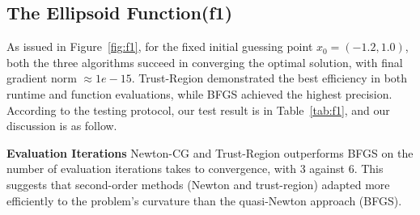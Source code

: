\documentclass[12pt]{article}
\begin{document}
\subsection{The Ellipsoid Function(f1)}

As issued in Figure~\ref{fig:f1}, for the fixed initial guessing point $x_0=(-1.2,1.0)$, both the three algorithms succeed in converging the optimal solution, with final gradient norm $\approx1e-15$. Trust-Region demonstrated the best efficiency in both runtime and function evaluations, while BFGS achieved the highest precision. According to the testing protocol, our test result is in Table~\ref{tab:f1}, and our discussion is as follow.

\textbf{Evaluation Iterations} 
Newton-CG and Trust-Region outperforms BFGS on the number of evaluation iterations takes to convergence, with 3 against 6. This suggests that second-order methods (Newton and trust-region) adapted more efficiently to the problem’s curvature than the quasi-Newton approach (BFGS).
 

\begin{table}[h]
    \centering
    \caption{Optimization results for the Ellipsoid Function.}
    \label{tab:f1}
\end{table}
\end{document}

